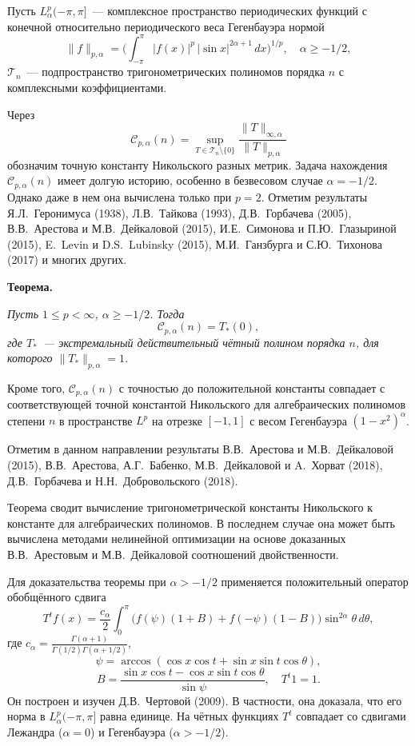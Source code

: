 \vzmscaption

Пусть $L_{\alpha}^{p}(-\pi,\pi]$~--- комплексное пространство периодических
функций с конечной относительно периодического веса Гегенбауэра нормой
\[
\|f\|_{p,\alpha}=\biggl(\int_{-\pi}^{\pi}|f(x)|^{p}\,|\!\sin
x|^{2\alpha+1}\,dx\biggr)^{1/p},\quad \alpha\ge -1/2,
\]
$\mathcal{T}_{n}$~--- подпространство тригонометрических полиномов порядка $n$
с комплексными коэффициентами.

Через
\[
\mathcal{C}_{p,\alpha}(n)=\sup_{T\in \mathcal{T}_{n}\setminus \{0\}}
\frac{\|T\|_{\infty,\alpha}}{\|T\|_{p,\alpha}}
\]
обозначим точную константу Никольского разных метрик. Задача нахождения
$\mathcal{C}_{p,\alpha}(n)$ имеет долгую историю, особенно в безвесовом случае
$\alpha=-1/2$. Однако даже в нем она вычислена только при $p=2$. Отметим
результаты Я.Л.~Геронимуса (1938), Л.В.~Тайкова (1993), Д.В.~Горбачева (2005),
В.В.~Арестова и М.В.~Дейкаловой (2015), И.Е.~Симонова и П.Ю.~Глазыриной (2015),
E.~Levin и D.S.~Lubinsky (2015), М.И.~Ганзбурга и С.Ю.~Тихонова (2017) и многих
других.

\textbf{Теорема.} {\it Пусть $1\le p<\infty$, $\alpha\ge -1/2$. Тогда
\[
\mathcal{C}_{p,\alpha}(n)=T_{*}(0),
\]
где $T_{*}$~--- экстремальный действительный чётный полином порядка $n$, для
которого $\|T_{*}\|_{p,\alpha}=1$.

Кроме того, $\mathcal{C}_{p,\alpha}(n)$ с точностью до положительной константы
совпадает с соответствующей точной константой Никольского для алгебраических
полиномов степени $n$ в пространстве $L^{p}$ на отрезке $[-1,1]$ с весом
Гегенбауэра $(1-x^{2})^{\alpha}$.}

Отметим в данном направлении результаты В.В.~Арестова и М.В.~Дейкаловой (2015),
В.В.~Арестова, А.Г.~Бабенко, М.В.~Дейкаловой и A.~Хорват (2018), Д.В.~Горбачева
и Н.Н.~Добровольского (2018).

Теорема сводит вычисление тригонометрической константы Никольского к константе
для алгебраических полиномов. В последнем случае она может быть вычислена
методами нелинейной оптимизации на основе доказанных В.В.~Арестовым и
М.В.~Дейкаловой соотношений двойственности.

Для доказательства теоремы при $\alpha>-1/2$ применяется положительный оператор
обобщённого сдвига
\[
T^{t}f(x)=\frac{c_{\alpha}}{2}\int_{0}^{\pi}\bigl(f(\psi)(1+B)+
f(-\psi)(1-B)\bigr)\sin^{2\alpha}\theta\,d\theta,
\]
где $c_{\alpha}=\frac{\Gamma(\alpha+1)}{\Gamma(1/2)\Gamma(\alpha+1/2)}$,
\[
\psi=\arccos (\cos x\cos t+\sin x\sin t\cos \theta),
\]
\[
B=\frac{\sin x\cos t-\cos x\sin t\cos \theta}{\sin \psi},\quad T^{t}1=1.
\]
Он построен и изучен Д.В.~Чертовой (2009). В частности, она доказала, что его
норма в $L_{\alpha}^{p}(-\pi,\pi]$ равна единице. На чётных функциях $T^{t}$
совпадает со сдвигами Лежандра ($\alpha=0$) и Гегенбауэра ($\alpha>-1/2$).
